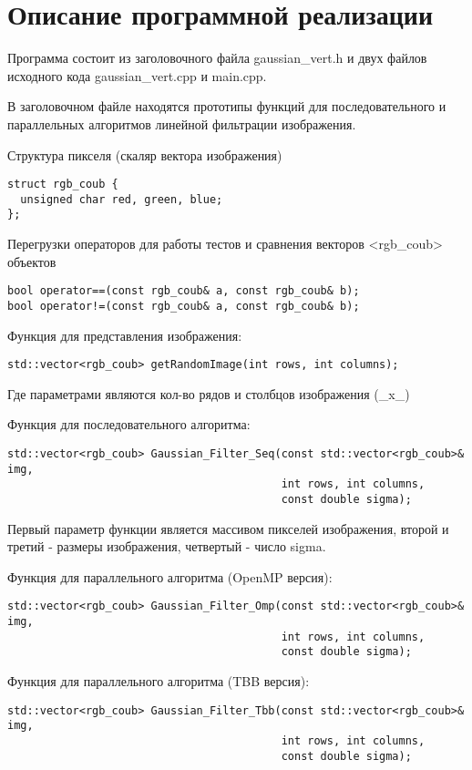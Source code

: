 \documentclass{report}
\begin{document}
\section*{Описание программной реализации}
Программа состоит из заголовочного файла gaussian\_vert.h и двух файлов исходного кода gaussian\_vert.cpp и main.cpp.
\par В заголовочном файле находятся прототипы функций для последовательного и параллельных алгоритмов линейной фильтрации изображения.
\par Структура пикселя (скаляр вектора изображения)
\begin{lstlisting}
struct rgb_coub {
  unsigned char red, green, blue;
};
\end{lstlisting}
\par Перегрузки операторов для работы тестов и сравнения векторов <rgb\_coub> объектов
\begin{lstlisting}
bool operator==(const rgb_coub& a, const rgb_coub& b);
bool operator!=(const rgb_coub& a, const rgb_coub& b);
\end{lstlisting}
\par Функция для представления изображения:
\begin{lstlisting}
std::vector<rgb_coub> getRandomImage(int rows, int columns);
\end{lstlisting}
Где параметрами являются кол-во рядов и столбцов изображения (\_x\_)
\par Функция для последовательного алгоритма:
\begin{lstlisting}
std::vector<rgb_coub> Gaussian_Filter_Seq(const std::vector<rgb_coub>& img,
                                          int rows, int columns,
                                          const double sigma);
\end{lstlisting}
Первый параметр функции является массивом пикселей изображения, второй и третий - размеры изображения, четвертый - число sigma.
\par Функция для параллельного алгоритма (OpenMP версия):
\begin{lstlisting}
std::vector<rgb_coub> Gaussian_Filter_Omp(const std::vector<rgb_coub>& img,
                                          int rows, int columns,
                                          const double sigma);
\end{lstlisting}
\par Функция для параллельного алгоритма (TBB версия):
\begin{lstlisting}
std::vector<rgb_coub> Gaussian_Filter_Tbb(const std::vector<rgb_coub>& img,
                                          int rows, int columns,
                                          const double sigma);
\end{lstlisting}
\end{document}
